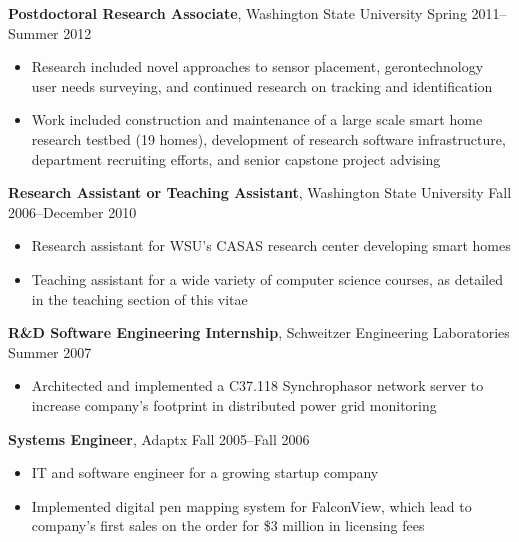 {\bf Postdoctoral Research Associate}, Washington State University \hfill Spring 2011--Summer 2012
\begin{itemize}
	\item{Research included novel approaches to sensor placement, gerontechnology user needs surveying, and continued research on tracking and identification}
	\item{Work included construction and maintenance of a large scale smart home research testbed (19 homes), development of research software infrastructure, department recruiting efforts, and senior capstone project advising}
\end{itemize}

{\bf Research Assistant or Teaching Assistant}, Washington State University \hfill Fall 2006--December 2010
\begin{itemize}
	\item{Research assistant for WSU's CASAS research center developing smart homes}
	\item{Teaching assistant for a wide variety of computer science courses, as detailed in the teaching section of this vitae}
\end{itemize}


{\bf R\&D Software Engineering Internship}, Schweitzer Engineering Laboratories \hfill Summer 2007
\begin{itemize}
	\item{Architected and implemented a C37.118 Synchrophasor network server to increase company's footprint in distributed power grid monitoring}
\end{itemize}

{\bf Systems Engineer}, Adaptx \hfill Fall 2005--Fall 2006
\begin{itemize}
	\item{IT and software engineer for a growing startup company}
    \item{Implemented digital pen mapping system for FalconView, which lead to company's first sales on the order for \$3 million in licensing fees}
\end{itemize}

